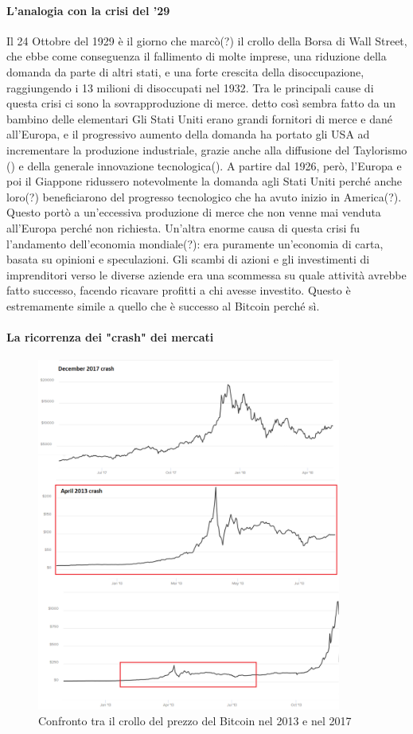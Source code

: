 \documentclass {article}
\begin{document}
{\paragraph {L'analogia con la crisi del '29}


Il 24 Ottobre del 1929 è il giorno che marcò(?) il crollo della Borsa di Wall Street, che ebbe come conseguenza il fallimento di molte imprese, una riduzione della domanda da parte di altri stati, e una forte crescita della disoccupazione, raggiungendo i 13 milioni di disoccupati nel 1932.
Tra le principali cause di questa crisi ci sono la sovrapproduzione di merce. detto così sembra fatto da un bambino delle elementari
Gli Stati Uniti erano grandi fornitori di merce e dané all'Europa, e il progressivo aumento della domanda ha portato gli USA ad incrementare la produzione industriale, grazie anche alla diffusione del Taylorismo () e della generale innovazione tecnologica().
A partire dal 1926, però, l'Europa e poi il Giappone ridussero notevolmente la domanda agli Stati Uniti perché anche loro(?) beneficiarono del progresso tecnologico che ha avuto inizio in America(?).
Questo portò a un'eccessiva produzione di merce che non venne mai venduta all'Europa perché non richiesta.
Un'altra enorme causa di questa crisi fu l'andamento dell'economia mondiale(?): era puramente un'economia di carta, basata su opinioni e speculazioni.
Gli scambi di azioni e gli investimenti di imprenditori verso le diverse aziende era una scommessa su quale attività avrebbe fatto successo, facendo ricavare profitti a chi avesse investito.
Questo è estremamente simile a quello che è successo al Bitcoin perché sì.


\paragraph {La ricorrenza dei "crash" dei mercati}


\vspace {0.5cm}
\begin {figure}[h]
\includegraphics [width = 10cm] {media/crash2.png}
\caption {Confronto tra il crollo del prezzo del Bitcoin nel 2013 e nel 2017}
\end {figure}
\vspace {0.5cm}

}
\end{document}
